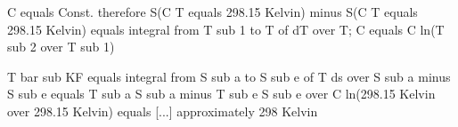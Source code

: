 C equals Const. therefore S(C T equals 298.15 Kelvin) minus S(C T equals 298.15 Kelvin) equals integral from T sub 1 to T of dT over T; C equals C ln(T sub 2 over T sub 1)

T bar sub KF equals integral from S sub a to S sub e of T ds over S sub a minus S sub e equals T sub a S sub a minus T sub e S sub e over C ln(298.15 Kelvin over 298.15 Kelvin) equals [...] approximately 298 Kelvin